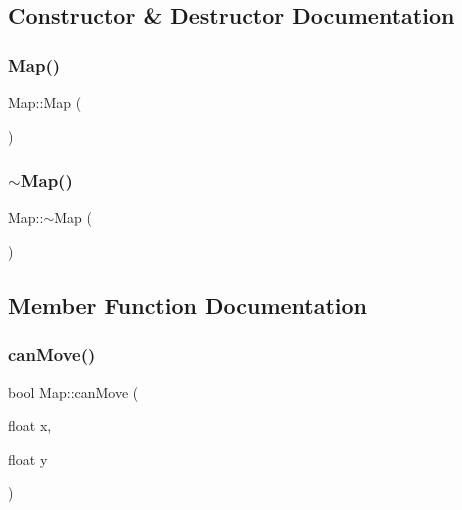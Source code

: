 \subsection{Constructor \& Destructor Documentation}
\mbox{\label{class_map_a0f5ad0fd4563497b4214038cbca8b582}} 
\subsubsection{\texorpdfstring{Map()}{Map()}}
{\footnotesize\ttfamily Map\+::\+Map (\begin{DoxyParamCaption}{ }\end{DoxyParamCaption})}

\mbox{\label{class_map_aa403fbe09394ccf39747588f5168e3b2}} 
\subsubsection{\texorpdfstring{$\sim$\+Map()}{~Map()}}
{\footnotesize\ttfamily Map\+::$\sim$\+Map (\begin{DoxyParamCaption}{ }\end{DoxyParamCaption})}



\subsection{Member Function Documentation}
\mbox{\label{class_map_a9e0db2b7f0c2cc2083da543050f0fa91}} 
\subsubsection{\texorpdfstring{can\+Move()}{canMove()}}
{\footnotesize\ttfamily bool Map\+::can\+Move (\begin{DoxyParamCaption}\item[{float}]{x,  }\item[{float}]{y }\end{DoxyParamCaption})}

\mbox{\label{class_map_a46c8ba4683ce97e3f5120be02b0ace94}} 
